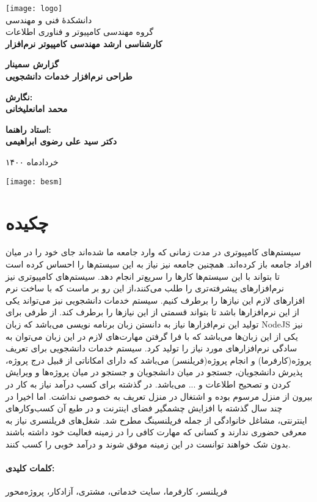 
\begin{titlepage}
	\centering
	\texttt{[image: logo]}
	\\[10pt]
	{\Large
		دانشکدۀ ‫فنی و مهندسی
		\\[10pt]
		گروه ‫مهندسی کامپیوتر و فناوری اطلاعات
		\\[15pt] \bfseries
		کارشناسی ارشد مهندسی کامپیوتر نرم‌افزار
	‬‫‬‬}

	\vfill
	{\Large \bfseries
		گزارش سمینار
	} \\[10pt]
	{\huge	\bfseries
			 طراحی نرم‌افزار خدمات دانشجویی
	}

	\vfill
	{\large \bfseries
	نگارش:
	\\[10pt]
	محمد  امانعلیخانی
	}

	\vfill
	{\large \bfseries
			استاد راهنما:
			\\[10pt]
			دکتر سید علی رضوی ابراهیمی
	}

	\vfill
	{\large خرداد‌ماه ۱۴۰۰}



\end{titlepage}


\thispagestyle{empty}
\begin{minipage}[c][\textheight][c]{\textwidth}%
	\centering
	\texttt{[image: besm]}
\end{minipage}%

\section*{چکیده}
سیستم‌های کامپیوتری در مدت زمانی که وارد جامعه ما شده‌اند جای خود را در میان افراد جامعه باز کرده‌اند.
همچنین جامعه نیز نیاز به این سیستم‌ها را احساس کرده است تا بتواند با این  سیستم‌ها  کارها را سریع‌تر انجام دهد.
سیستم‌های کامپیوتری نیز نرم‌افزارهای پیشرفته‌تری را طلب می‌کنند،از این رو بر ماست که با ساخت نرم افزارهای لازم این نیازها را برطرف کنیم.
سیستم خدمات دانشجویی نیز می‌تواند یکی از این نرم‌افزارها باشد تا بتواند قسمتی از این نیازها را برطرف کند.
از طرفی برای تولید این نرم‌افزارها نیاز به دانستن زبان‌ برنامه نویسی می‌باشد که زبان NodeJS نیز یکی از این زبان‌ها می‌باشد که با فرا گرفتن مهارت‌های لازم در این زبان می‌توان به سادگی نرم‌افزارهای مورد نیاز را تولید کرد.
سیستم خدمات دانشجویی برای تعریف پروژه(کارفرما) و انجام پروژه(فریلنسر) می‌باشد که دارای امکاناتی از قبیل درج پروژه، پذیرش دانشجویان، جستجو در میان دانشجویان و جستجو در میان پروژه‌ها و ویرایش کردن و تصحیح اطلاعات و ... می‌باشد.
در گذشته برای کسب درآمد نیاز به کار در بیرون از منزل مرسوم بوده و اشتغال در منزل تعریف به خصوصی نداشت.
اما اخیرا در چند سال گذشته با افزایش چشمگیر فضای اینترنت و در طبع آن کسب‌وکارهای اینترنتی، مشاغل خانوادگی از جمله فریلنسینگ مطرح شد.
شغل‌های فریلنسری نیاز به معرفی حضوری ندارند و کسانی که مهارت کافی را در زمینه فعالیت خود داشته باشند بدون شک خواهند توانست در این زمینه موفق شوند و درآمد خوبی را کسب کنند.
\paragraph{کلمات کلیدی:}
فریلنسر، کارفرما، سایت خدماتی، مشتری، آزادکار، پروژه‌محور

\thispagestyle{empty}
\pagestyle{plain}
\setcounter{page}{1}
\clearpage










